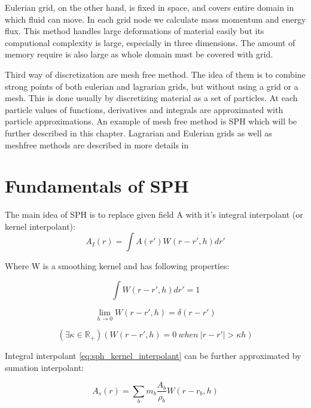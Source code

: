 Eulerian grid, on the other hand, is fixed in space, and covers entire domain in which fluid can move. In each grid node we calculate mass momentum and energy flux. This method handles large deformations of material easily but its computional complexity is large, especially in three dimensions. The amount of memory require is also large as whole domain must be covered with grid. 

Third way of discretization are mesh free method. The idea of them is to combine strong points of both eulerian and lagrarian grids, but without using a grid or a mesh. This is done usually by discretizing material as a set of particles. At each particle values of functions, derivatives and integrals are approximated with particle approximations. An example of mesh free method is SPH which will be further described in this chapter. 
Lagrarian and Eulerian grids as well as meshfree methods are described in more details in \cite[chapter 1]{Liu}

\section{Fundamentals of SPH}

The main idea of SPH is to replace given field A with it's integral interpolant (or kernel interpolant):
\begin{equation}
\label{eq:sph_kernel_interpolant}
A_I(r) = \int A(r')W(r - r', h)dr'
\end{equation}

Where W is a smoothing kernel and has following properties:

\begin{equation}
\label{eq:sph_kernel_property_1}
\int W(r - r', h)dr' = 1
\end{equation}

\begin{equation}
\label{eq:sph_kernel_property_2}
\lim_{h \to 0}W(r - r', h) = \delta(r-r')
\end{equation}

\begin{equation}
\label{eq:compact_condition}
(\exists \kappa \in \mathbb{R}_+ )(W(r-r', h) = 0~when~|r-r'| > \kappa h)
\end{equation}

Integral interpolant \ref{eq:sph_kernel_interpolant} can be further approximated by sumation interpolant:

\begin{equation}
\label{eq:sumation_interpolant}
A_s(r) = \sum_{b}m_b\frac{A_b}{\rho_b}W(r-r_b,h)
\end{equation}

